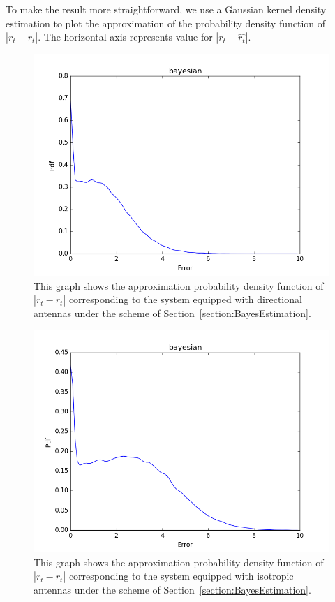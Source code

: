 To make the result more straightforward, we use a Gaussian kernel density estimation to plot the approximation of the probability density function of $|r_{t}-\hat{r_{t}}|$.
The horizontal axis represents value for $|r_{t}-\hat{r_{t}}|$.
\begin{figure}[]
	\centering
	\includegraphics[scale=0.5]{Figures/bayesrtdir.png}
	\caption{This graph shows the approximation probability density function of $|r_{t}-\hat{r_{t}}|$ corresponding to the system equipped with directional antennas under the scheme of Section~\ref{section:BayesEstimation}. }
	\label{figure: BayesRtdir}
\end{figure}
\begin{figure}[]
	\centering
	\includegraphics[scale=0.5]{Figures/bayesrtomni.png}
	\caption{This graph shows the approximation probability density function of $|r_{t}-\hat{r_{t}}|$ corresponding to the system equipped with isotropic antennas under the scheme of Section~\ref{section:BayesEstimation}. }
	\label{figure: BayesRtomni}
\end{figure}
